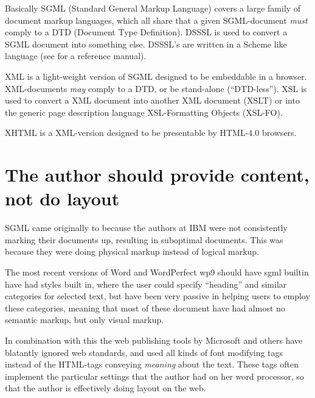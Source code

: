 Basically SGML (Standard General Markup Language) covers a large
family of document markup languages, which all share that a given
SGML-document \textit{must} comply to a DTD (Document Type
Definition).  DSSSL is used to convert a SGML document into something
else.  DSSSL's are written in a Scheme like language (see
\cite{Dybvig:1996:SPL} for a reference manual).

XML is a light-weight version of SGML designed to be embeddable in a
browser.  XML-documents \textit{may} comply to a DTD, or be
stand-alone (``DTD-less'').  XSL is used to convert a XML document
into another XML document (XSLT) or into the generic page description
language XSL-Formatting Objects (XSL-FO).

XHTML is a XML-version designed to be presentable by HTML-4.0
browsers.

\section{The author should provide content, not do layout}

SGML came originally to because the authors at IBM were not
consistently marking their documents up, resulting in suboptimal
documents.  This was because they were doing physical markup instead
of logical markup.

  
The most recent versions of Word and WordPerfect \textsf{wp9 should
  have sgml builtin} have had styles built
in, where the user could specify ``heading'' and similar categories
for selected text, but have been very passive in helping users to
employ these categories, meaning that most of these
document have had almost no semantic markup, but only visual markup.

In combination with this the web publishing tools by Microsoft and
others have blatantly ignored web standards, and used all kinds of
font modifying tags instead of the HTML-tags conveying \textit{meaning}
about the text.  These tags often implement the particular settings
that the author had on her word processor, so that the author is
effectively doing layout on the web.

